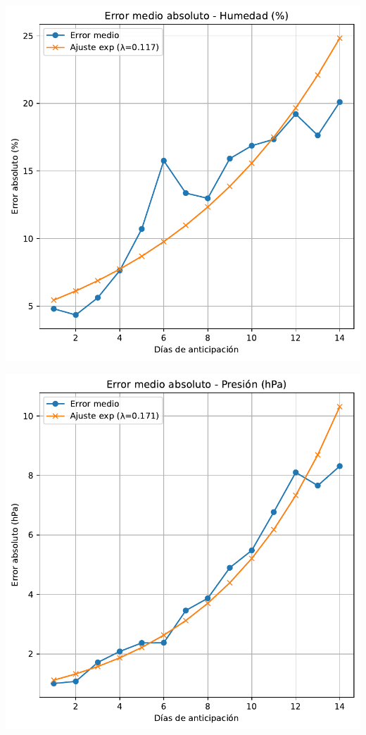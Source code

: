 \documentclass[
  10pt,
  a4paper,
  DIV=11,
  numbers=noendperiod,
  open=any]{scrreprt}
\makeatletter
\newcommand*\pandocbounded[1]{%
  \sbox\pandoc@box{#1}%
  \Gscale@div\@tempa{\textheight}{\dimexpr\ht\pandoc@box+\dp\pandoc@box\relax}%
  \Gscale@div\@tempb{\linewidth}{\wd\pandoc@box}%
  \ifdim\@tempb\p@<\@tempa\p@\let\@tempa\@tempb\fi%
  \ifdim\@tempa\p@<\p@\scalebox{\@tempa}{\usebox\pandoc@box}%
  \else\usebox{\pandoc@box}%
  \fi%
}
\numberwithin{equation}{chapter}
\numberwithin{equation}{section}
\renewcommand{\[}{\begin{equation}}
\renewcommand{\]}{\end{equation}}
\providecommand{\pandocbounded}[1]{#1}%
\renewcommand{\pandocbounded}[1]{\begingroup\centering #1\par\endgroup}
\makeatother
\begin{document}
\pandocbounded{\includegraphics[keepaspectratio]{03-meteorologia/predicciones_files/figure-pdf/cell-4-output-2.pdf}}

\pandocbounded{\includegraphics[keepaspectratio]{03-meteorologia/predicciones_files/figure-pdf/cell-4-output-3.pdf}}
\end{document}
